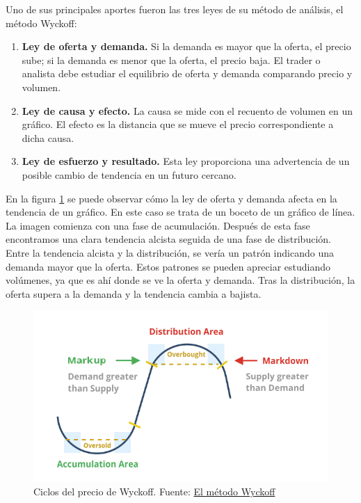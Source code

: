Uno de sus principales aportes fueron las tres leyes de su método de análisis, el método Wyckoff:\newline

\begin{enumerate}
	\item \textbf{Ley de oferta y demanda.} Si la demanda es mayor que la oferta, el precio sube; si la demanda es menor que la oferta, el precio baja. El trader o analista debe estudiar el equilibrio de oferta y demanda comparando precio y volumen.
	\item \textbf{Ley de causa y efecto.} La causa se mide con el recuento de volumen en un gráfico. El efecto es la distancia que se mueve el precio correspondiente a dicha causa.
	\item \textbf{Ley de esfuerzo y resultado.} Esta ley proporciona una advertencia de un posible cambio de tendencia en un futuro cercano.
\end{enumerate}

En la figura \ref{ciclos_wyckoff} se puede observar cómo la ley de oferta y demanda afecta en la tendencia de un gráfico. En este caso se trata de un boceto de un gráfico de línea. La imagen comienza con una fase de acumulación. Después de esta fase encontramos una clara tendencia alcista seguida de una fase de distribución. Entre la tendencia alcista y la distribución, se vería un patrón indicando una demanda mayor que la oferta. Estos patrones se pueden apreciar estudiando volúmenes, ya que es ahí donde se ve la oferta y demanda. Tras la distribución, la oferta supera a la demanda y la tendencia cambia a bajista.\newline

\begin{figure}[h]
	\includegraphics[width=1\textwidth]{imagenes/oferta_demanda_wyckoff.png} 
	\caption{Ciclos del precio de Wyckoff. Fuente: \color{blue} \href{https://www.wyckoffanalytics.com/wyckoff-method-spanish/}{El método Wyckoff}} \label{ciclos_wyckoff}
\end{figure}

